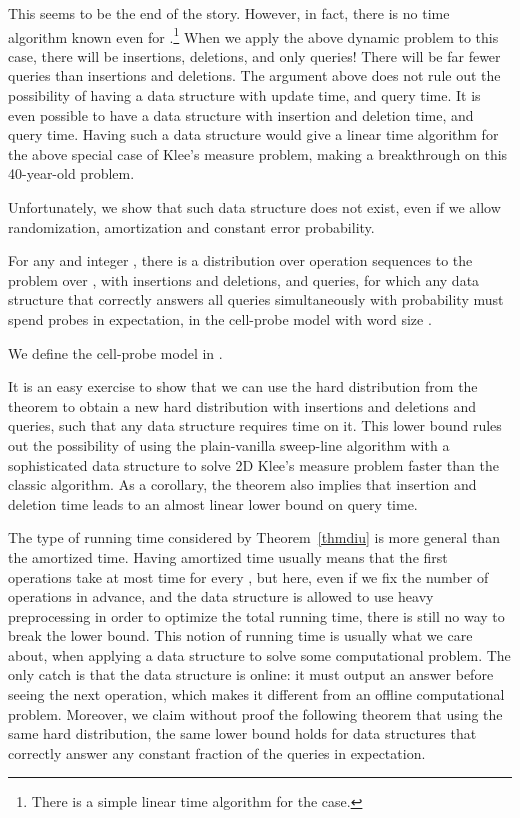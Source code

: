 \documentclass[11pt]{article}
\begin{document}
This seems to be the end of the story. However, in fact, there is no  time algorithm known even for .\footnote{There is a simple linear time algorithm for the  case.} When we apply the above dynamic problem to this case, there will be  insertions,  deletions, and only  queries! There will be far fewer queries than insertions and deletions. The argument above does not rule out the possibility of having a \diu{} data structure with  update time, and  query time. It is even possible to have a data structure with  insertion and deletion time, and  query time. Having such a data structure would give a linear time algorithm for the above special case of Klee's measure problem, making a breakthrough on this 40-year-old problem. 

Unfortunately, we show that such data structure does not exist, even if we allow randomization, amortization and constant error probability. 

\begin{theorem}\label{thmdiu}
	For any  and integer , there is a distribution over operation sequences to the \diu{} problem over , with  insertions and deletions, and  queries, for which any data structure that correctly answers all queries simultaneously with probability  must spend  probes in expectation, in the cell-probe model with word size . 
\end{theorem}
We define the cell-probe model in \iftoggle{conf}{Appendix~\ref{sectcp_app}}{Section~\ref{subsectcp}}. 

It is an easy exercise to show that we can use the hard distribution from the theorem to obtain a new hard distribution with  insertions and deletions and  queries, such that any data structure requires  time on it. This lower bound rules out the possibility of using the plain-vanilla sweep-line algorithm with a sophisticated data structure to solve 2D Klee's measure problem faster than the classic algorithm. As a corollary, the theorem also implies that  insertion and deletion time leads to an almost linear lower bound on query time. 

The type of running time considered by Theorem~\ref{thmdiu} is more general than the amortized time. Having amortized time  usually means that the first  operations take at most  time for every , but here, even if we fix the number of operations in advance, and the data structure is allowed to use heavy preprocessing in order to optimize the total running time, there is still no way to break the lower bound. This notion of running time is usually what we care about, when applying a data structure to solve some computational problem. The only catch is that the data structure is online: it must output an answer before seeing the next operation, which makes it different from an offline computational problem. Moreover, we claim without proof the following theorem that using the same hard distribution, the same lower bound holds for data structures that correctly answer any constant fraction of the queries in expectation. 
\end{document}
